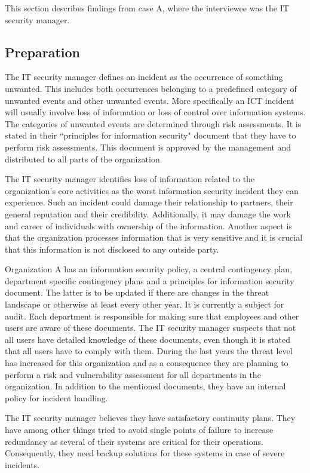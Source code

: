 This section describes findings from case A, where the interviewee was the IT security manager.

\subsection{Preparation}
The IT security manager defines an incident as the occurrence of something unwanted. This includes both occurrences belonging to a predefined category of unwanted events and other unwanted events. More specifically an \ac{ICT} incident will usually involve loss of information or loss of control over information systems. The categories of unwanted events are determined through risk assessments. It is stated in their ``principles for information security" document that they have to perform risk assessments. This document is approved by the management and distributed to all parts of the organization. 

The IT security manager identifies loss of information related to the organization's core activities as the worst information security incident they can experience. Such an incident could damage their relationship to partners, their general reputation and their credibility. Additionally, it may damage the work and career of individuals with ownership of the information. Another aspect is that the organization processes information that is very sensitive and it is crucial that this information is not disclosed to any outside party. 

Organization A has an information security policy, a central contingency plan, department specific contingency plans and a principles for information security document. The latter is to be updated if there are changes in the threat landscape or otherwise at least every other year. It is currently a subject for audit. Each department is responsible for making sure that employees and other users are aware of these documents. The IT security manager suspects that not all users have detailed knowledge of these documents, even though it is stated that all users have to comply with them. During the last years the threat level has increased for this organization and as a consequence they are planning to perform a risk and vulnerability assessment for all departments in the organization. In addition to the mentioned documents, they have an internal policy for incident handling.

The IT security manager believes they have satisfactory continuity plans. They have among other things tried to avoid single points of failure to increase redundancy as several of their systems are critical for their operations. Consequently, they need backup solutions for these systems in case of severe incidents. 

